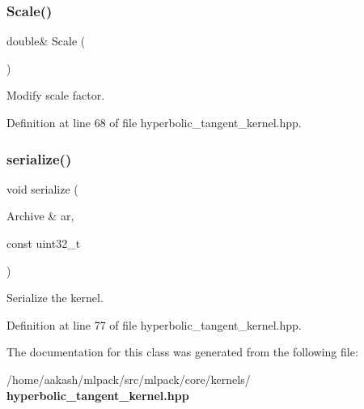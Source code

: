 \subsubsection{Scale()\hspace{0.1cm}{\footnotesize\ttfamily [2/2]}}
{\footnotesize\ttfamily double\& Scale (\begin{DoxyParamCaption}{ }\end{DoxyParamCaption})\hspace{0.3cm}{\ttfamily [inline]}}



Modify scale factor. 



Definition at line 68 of file hyperbolic\+\_\+tangent\+\_\+kernel.\+hpp.

\mbox{\label{classmlpack_1_1kernel_1_1HyperbolicTangentKernel_a65cba07328997659bec80b9879b15a51}} 
\subsubsection{serialize()}
{\footnotesize\ttfamily void serialize (\begin{DoxyParamCaption}\item[{Archive \&}]{ar,  }\item[{const uint32\+\_\+t}]{ }\end{DoxyParamCaption})\hspace{0.3cm}{\ttfamily [inline]}}



Serialize the kernel. 



Definition at line 77 of file hyperbolic\+\_\+tangent\+\_\+kernel.\+hpp.



The documentation for this class was generated from the following file\+:\begin{DoxyCompactItemize}
\item 
/home/aakash/mlpack/src/mlpack/core/kernels/\textbf{ hyperbolic\+\_\+tangent\+\_\+kernel.\+hpp}\end{DoxyCompactItemize}
